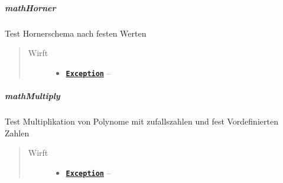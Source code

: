 \documentclass[letterpaper,10pt,ngerman]{sphinxmanual}
\begin{document}
\subparagraph{mathHorner}
\label{com/linuxluigi/polynomial/PolynomialListTest:mathhorner}

\begin{fulllineitems}
\label{com/linuxluigi/polynomial/PolynomialListTest:com.linuxluigi.polynomial.PolynomialListTest.mathHorner()}
Test Hornerschema nach festen Werten
\begin{quote}\begin{description}
\item[{Wirft}] \leavevmode\begin{itemize}
\item {} 
\href{http://docs.oracle.com/javase/6/docs/api/java/lang/Exception.html}{\textbf{\texttt{Exception}}} -- 

\end{itemize}

\end{description}\end{quote}

\end{fulllineitems}



\subparagraph{mathMultiply}
\label{com/linuxluigi/polynomial/PolynomialListTest:mathmultiply}

\begin{fulllineitems}
\label{com/linuxluigi/polynomial/PolynomialListTest:com.linuxluigi.polynomial.PolynomialListTest.mathMultiply()}
Test Multiplikation von Polynome mit zufallszahlen und fest Vordefinierten Zahlen
\begin{quote}\begin{description}
\item[{Wirft}] \leavevmode\begin{itemize}
\item {} 
\href{http://docs.oracle.com/javase/6/docs/api/java/lang/Exception.html}{\textbf{\texttt{Exception}}} -- 

\end{itemize}

\end{description}\end{quote}

\end{fulllineitems}
\end{document}
